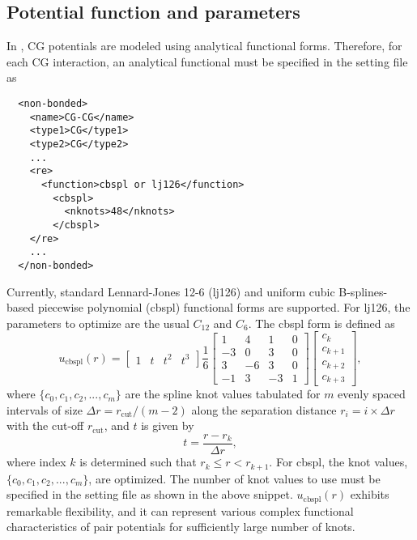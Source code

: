 \subsection{Potential function and parameters}
In \re, CG potentials are modeled using analytical functional forms. Therefore,
for each CG interaction, an analytical functional must be specified in the \xml
setting file as
\begin{lstlisting}
  <non-bonded>
    <name>CG-CG</name>
    <type1>CG</type1>
    <type2>CG</type2>
    ...
    <re>
      <function>cbspl or lj126</function>
        <cbspl>
          <nknots>48</nknots>
        </cbspl>
    </re>
    ...
  </non-bonded>
\end{lstlisting}
Currently, standard Lennard-Jones 12-6 (lj126) and uniform cubic B-splines-based
piecewise polynomial (cbspl) functional forms are supported. For lj126, the
parameters to optimize are the usual $C_{12}$ and $C_{6}$. The cbspl form is
defined as
\begin{equation}
\label{eq:cbspl}
u_{\text{cbspl}}(r) = \left[\begin{array}{cccc}
    1 & t & t^2 & t^3 \end{array}\right]
\frac{1}{6}
\left[ \begin{array}{rrrr}
    1 & 4 & 1 & 0 \\
    -3 & 0 & 3 & 0 \\
    3 & -6 & 3 & 0 \\
    -1 & 3 & -3 & 1 \end{array}\right]
\left[ \begin{array}{l}
    c_{k} \\
    c_{k+1} \\
    c_{k+2} \\
    c_{k+3} \end{array}\right] ,
\end{equation}
where $\{c_0,c_1,c_2,...,c_m\}$ are the spline knot values tabulated for $m$
evenly spaced intervals of size $\Delta r = r_{\text{cut}}/(m-2)$ along the
separation distance $r_{i} = i\times\Delta r$ with the cut-off $r_{\text{cut}}$,
and $t$ is given by
\begin{equation}
\label{eq:cbspl_t}
t = \frac{r-r_{k}}{\Delta r} ,
\end{equation}
where index $k$ is determined such that $r_{k}\leq r < r_{k+1}$. For cbspl, the
knot values, $\{c_0,c_1,c_2,...,c_m\}$, are optimized. The number of knot values
to use must be specified in the \xml setting file as shown in the above
snippet. $u_{\text{cbspl}}(r)$ exhibits remarkable flexibility, and it can
represent various complex functional characteristics of pair potentials for
sufficiently large number of knots.

